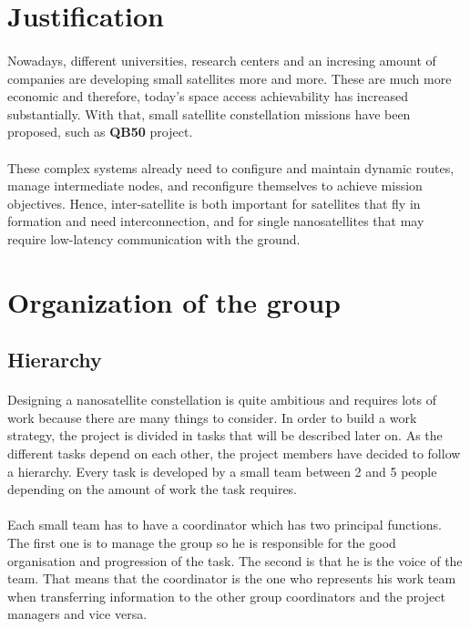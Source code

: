 \documentclass[12pt, titlepage]{scrartcl}
\begin{document}
\section{Justification } \label{justification}
\paragraph{}Nowadays, different universities, research centers and an incresing amount of companies are developing small satellites more and more. These are much more economic and therefore, today’s space access achievability has increased substantially. With that, small satellite constellation missions have been proposed, such as \textbf{QB50} project.

\paragraph{}These complex systems already need to configure and maintain dynamic routes, manage intermediate nodes, and reconfigure themselves to achieve mission objectives. Hence, inter-satellite is both important for satellites that fly in formation and need interconnection, and for single nanosatellites that may require low-latency communication with the ground.


\section{Organization of the group}


\subsection{Hierarchy}
\paragraph{}
Designing a nanosatellite constellation is quite ambitious and requires lots of work because there are many things to consider. In order to build a work strategy, the project is divided in tasks that will be described later on. As the different tasks depend on each other, the project members have decided to follow a hierarchy. Every task is developed by a small team between 2 and 5 people depending on the amount of work the task requires.
\paragraph{}
Each small team has to have a coordinator which has two principal functions. The first one is to manage the group so he is responsible for the good organisation and progression of the task. The second is that he is the voice of the team. That means that the coordinator is the one who represents his work team when transferring information to the other group coordinators and the project managers and vice versa. 
\end{document}
